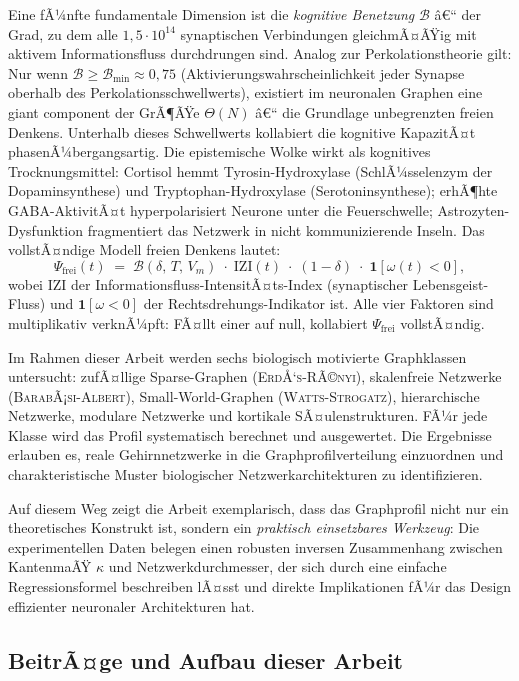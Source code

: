 ﻿\documentclass[a4paper,12pt]{article}
\theoremstyle{definition}
\begin{document}
	Eine fÃ¼nfte fundamentale Dimension ist die \emph{kognitive Benetzung} $\mathcal{B}$ â€“ der Grad, zu dem alle $1{,}5 \cdot 10^{14}$ synaptischen Verbindungen gleichmÃ¤ÃŸig mit aktivem Informationsfluss durchdrungen sind. Analog zur Perkolationstheorie gilt: Nur wenn $\mathcal{B} \geq \mathcal{B}_{\min} \approx 0{,}75$ (Aktivierungswahrscheinlichkeit jeder Synapse oberhalb des Perkolationsschwellwerts), existiert im neuronalen Graphen eine giant component der GrÃ¶ÃŸe $\Theta(N)$ â€“ die Grundlage unbegrenzten freien Denkens. Unterhalb dieses Schwellwerts kollabiert die kognitive KapazitÃ¤t phasenÃ¼bergangsartig. Die epistemische Wolke wirkt als kognitives Trocknungsmittel: Cortisol hemmt Tyrosin-Hydroxylase (SchlÃ¼sselenzym der Dopaminsynthese) und Tryptophan-Hydroxylase (Serotoninsynthese); erhÃ¶hte GABA-AktivitÃ¤t hyperpolarisiert Neurone unter die Feuerschwelle; Astrozyten-Dysfunktion fragmentiert das Netzwerk in nicht kommunizierende Inseln. Das vollstÃ¤ndige Modell freien Denkens lautet:
	\[
	\Psi_{\mathrm{frei}}(t) \;=\; \mathcal{B}(\delta,\,T,\,V_m) \;\cdot\; \mathrm{IZI}(t) \;\cdot\; (1-\delta) \;\cdot\; \mathbf{1}[\omega(t) < 0],
	\]
	wobei $\mathrm{IZI}$ der Informationsfluss-IntensitÃ¤ts-Index (synaptischer Lebensgeist-Fluss) und $\mathbf{1}[\omega < 0]$ der Rechtsdrehungs-Indikator ist. Alle vier Faktoren sind multiplikativ verknÃ¼pft: FÃ¤llt einer auf null, kollabiert $\Psi_{\mathrm{frei}}$ vollstÃ¤ndig.

	Im Rahmen dieser Arbeit werden sechs biologisch motivierte Graphklassen untersucht: zufÃ¤llige Sparse-Graphen (\textsc{ErdÅ‘s-RÃ©nyi}), skalenfreie Netzwerke (\textsc{BarabÃ¡si-Albert}), Small-World-Graphen (\textsc{Watts-Strogatz}), hierarchische Netzwerke, modulare Netzwerke und kortikale SÃ¤ulenstrukturen. FÃ¼r jede Klasse wird das Profil systematisch berechnet und ausgewertet. Die Ergebnisse erlauben es, reale Gehirnnetzwerke in die Graphprofilverteilung einzuordnen und charakteristische Muster biologischer Netzwerkarchitekturen zu identifizieren.

	Auf diesem Weg zeigt die Arbeit exemplarisch, dass das Graphprofil nicht nur ein theoretisches Konstrukt ist, sondern ein \emph{praktisch einsetzbares Werkzeug}: Die experimentellen Daten belegen einen robusten inversen Zusammenhang zwischen KantenmaÃŸ $\kappa$ und Netzwerkdurchmesser, der sich durch eine einfache Regressionsformel beschreiben lÃ¤sst und direkte Implikationen fÃ¼r das Design effizienter neuronaler Architekturen hat.

	\subsection{BeitrÃ¤ge und Aufbau dieser Arbeit}
\end{document}
